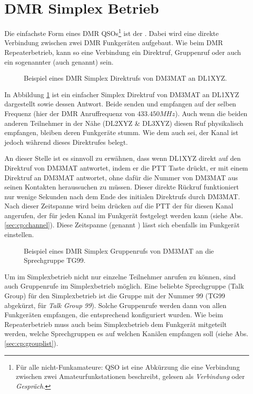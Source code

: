 \section{DMR Simplex Betrieb} \label{sec:simplex}
Die einfachste Form eines DMR QSOs\footnote{Für alle nicht-Funkamateure: QSO ist eine Abkürzung die eine Verbindung zwischen zwei Amateurfunkstationen beschreibt, gelesen als \emph{Verbindung} oder \emph{Gespräch}.} ist der . Dabei wird eine direkte Verbindung zwischen zwei DMR Funkgeräten aufgebaut. Wie beim DMR Repeaterbetrieb, kann so eine Verbindung ein Direktruf, Gruppenruf oder auch ein sogenannter  (auch  genannt) sein. 

\begin{figure}[!ht]
 \centering
 
 \caption{Beispiel eines DMR Simplex Direktrufs von DM3MAT an DL1XYZ.} \label{fig:splxpc}
\end{figure}

In Abbildung \ref{fig:splxpc} ist ein einfacher Simplex Direktruf von DM3MAT an DL1XYZ dargestellt sowie dessen Antwort. Beide senden und empfangen auf der selben Frequenz (hier der DMR Anruffrequenz von $433.450 MHz$). Auch wenn die beiden anderen Teilnehmer in der Nähe (DL2XYZ \& DL3XYZ) diesen Ruf physikalisch empfangen, bleiben deren Funkgeräte stumm. Wie dem auch sei, der Kanal ist jedoch während dieses Direktrufes belegt. 

An dieser Stelle ist es sinnvoll zu erwähnen, dass wenn DL1XYZ direkt auf den Direktruf von DM3MAT antwortet, indem er die PTT Taste drückt, er mit einem Direktruf an DM3MAT antwortet, ohne dafür die Nummer von DM3MAT aus seinen Kontakten heraussuchen zu müssen. Dieser direkte Rückruf funktioniert nur wenige Sekunden nach dem Ende des initialen Direktrufs durch DM3MAT. Nach dieser Zeitspanne wird beim drücken auf die PTT der  für diesen Kanal angerufen, der für jeden Kanal im Funkgerät festgelegt werden kann (siehe Abs. \ref{sec:cp:channel}). Diese Zeitspanne (genannt ) lässt sich ebenfalls im Funkgerät einstellen.

\begin{figure}[!ht]
  \centering
  
  \caption{Beispiel eines DMR Simplex Gruppenrufs von DM3MAT an die Sprechgruppe TG99.} \label{fig:splxgc}
\end{figure}

Um im Simplexbetrieb nicht nur einzelne Teilnehmer anrufen zu können, sind auch Gruppenrufe im Simplexbetrieb möglich. Eine beliebte Sprechgruppe (Talk Group) für den Simplexbetrieb ist die Gruppe mit der Nummer 99  (TG99 abgekürzt, für \emph{Talk Group 99}). Solche Gruppenrufe werden dann von allen Funkgeräten empfangen, die entsprechend konfiguriert wurden. Wie beim Repeaterbetrieb muss auch beim Simplexbetrieb dem Funkgerät mitgeteilt werden, welche Sprechgruppen es auf welchen Kanälen empfangen soll (siehe Abs. \ref{sec:cp:grouplist}). 

